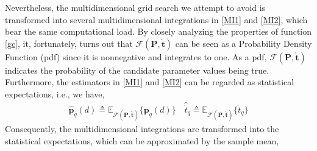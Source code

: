 \documentclass[review]{elsarticle}
\begin{document}
Nevertheless, the multidimensional grid search we attempt to avoid is transformed into several multidimensional integrations in \eqref{MI1} and \eqref{MI2}, which bear the same computational load. By closely analyzing the properties of function \eqref{gc}, it, fortunately, turns out that $\mathcal{F}(\boldsymbol{P},\mathring{\boldsymbol{t}})$ can be seen as a Probability Density Function (pdf) since it is nonnegative and integrates to one. As a pdf, $\mathcal{F}(\boldsymbol{P},\mathring{\boldsymbol{t}})$ indicates the probability of the candidate parameter values being true. Furthermore, the estimators in \eqref{MI1} and \eqref{MI2} can be regarded as statistical expectations, i.e., we have,
\begin{align}\label{ex}
    \hat{\boldsymbol{p}}_q(d)\triangleq \mathbb{E}_{\mathcal{F}(\boldsymbol{P},\mathring{\boldsymbol{t}})}\{\boldsymbol{p}_q(d)\} \quad \hat{\mathring{t}}_q\triangleq \mathbb{E}_{\mathcal{F}(\boldsymbol{P},\mathring{\boldsymbol{t}})}\{\mathring{t}_q\}
\end{align}
Consequently, the multidimensional integrations are transformed into the statistical expectations, which can be approximated by the sample mean,
\end{document}

